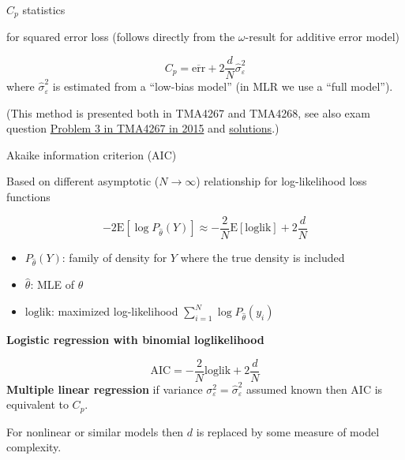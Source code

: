 \documentclass[
  ignorenonframetext,
]{beamer}
\providecommand{\tightlist}{%
  \setlength{\itemsep}{0pt}\setlength{\parskip}{0pt}}
\begin{document}
\begin{frame}

\begin{block}{\(C_p\) statistics}

for squared error loss (follows directly from the \(\omega\)-result for
additive error model)

\[C_p=\overline{\text{err}}+2\frac{d}{N}\hat{\sigma}_{\varepsilon}^2\]
where \(\hat{\sigma}_{\varepsilon}^2\) is estimated from a ``low-bias
model'' (in MLR we use a ``full model'').

(This method is presented both in TMA4267 and TMA4268, see also exam
question
\href{https://www.math.ntnu.no/emner/TMA4267/2017v/Exam/eV2015.pdf}{Problem
3 in TMA4267 in 2015} and
\href{https://www.math.ntnu.no/emner/TMA4267/2017v/Exam/lV2015.pdf}{solutions}.)

\end{block}

\end{frame}

\begin{frame}

\begin{block}{Akaike information criterion (AIC)}

Based on different asymptotic (\(N \rightarrow \infty\)) relationship
for log-likelihood loss functions

\[ -2 \text{E}[\log P_{\hat{\theta}}(Y)]\approx - \frac{2}{N} \text{E}[\text{loglik}]+2 \frac{d}{N} \]

\begin{itemize}
\tightlist
\item
  \(P_{\hat{\theta}}(Y)\): family of density for \(Y\) where the true
  density is included
\item
  \(\hat{\theta}\): MLE of \(\theta\)
\item
  \(\text{loglik}\): maximized log-likelihood
  \(\sum_{i=1}^N \log P_{\hat{\theta}}(y_i)\)
\end{itemize}

\textbf{Logistic regression with binomial loglikelihood}

\[ \text{AIC}=- \frac{2}{N} \text{loglik}+2 \frac{d}{N}\]
\textbf{Multiple linear regression} if variance
\(\sigma_{\varepsilon}^2=\hat{\sigma}_{\varepsilon}^2\) assumed known
then AIC is equivalent to \(C_p\).

For nonlinear or similar models then \(d\) is replaced by some measure
of model complexity.

\end{block}

\end{frame}
\end{document}
